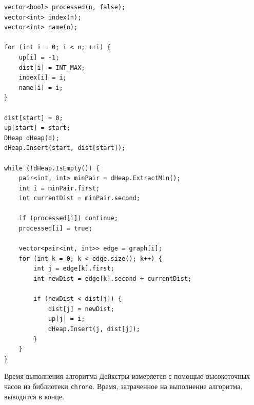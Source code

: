 \begin{lstlisting}
vector<bool> processed(n, false);
vector<int> index(n);
vector<int> name(n);

for (int i = 0; i < n; ++i) {
    up[i] = -1;
    dist[i] = INT_MAX;
    index[i] = i;
    name[i] = i;
}

dist[start] = 0;
up[start] = start;
DHeap dHeap(d);
dHeap.Insert(start, dist[start]);

while (!dHeap.IsEmpty()) {
    pair<int, int> minPair = dHeap.ExtractMin();
    int i = minPair.first;
    int currentDist = minPair.second;

    if (processed[i]) continue; 
    processed[i] = true;

    vector<pair<int, int>> edge = graph[i];
    for (int k = 0; k < edge.size(); k++) {
        int j = edge[k].first;
        int newDist = edge[k].second + currentDist;

        if (newDist < dist[j]) {
            dist[j] = newDist;
            up[j] = i;
            dHeap.Insert(j, dist[j]);
        }
    }
}
\end{lstlisting}

Время выполнения алгоритма Дейкстры измеряется с помощью высокоточных часов из библиотеки \texttt{chrono}. Время, затраченное на выполнение алгоритма, выводится в конце.

